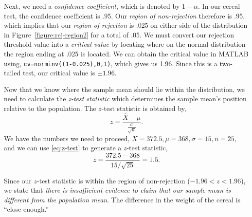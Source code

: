 Next, we need a \emph{confidence coefficient}, which is denoted by $1-\alpha$. In our cereal test, the confidence coefficient is .95. Our \emph{region of non-rejection} therefore is .95, which implies that our \emph{region of rejection} is .025 on either side of the distribution in Figure~\ref{figure:rej-region2} for a total of .05. We must convert our rejection threshold value into a \emph{critical value} by locating where on the normal distribution the region ending at .025 is located. We can obtain the critical value in MATLAB using,
\texttt{cv=norminv((1-0.025),0,1)}, which gives  us 1.96. Since this is a two-tailed test, our critical value is $\pm 1.96$.

Now that we know where the sample mean should lie within the distribution, we need to calculate the \emph{z-test statistic} which determines the sample mean's position relative to the population. The $z$-test statistic is obtained by,
\begin{equation}
\boxed{\quad z = \frac{\bar{X} - \mu}{\frac{\sigma}{\sqrt{n}}}. \quad}
\label{eq:z-test}
\end{equation}
We have the numbers we need to proceed, $\bar{X}=372.5, \mu=368, \sigma=15, n=25$, and we can use \eqref{eq:z-test} to generate a $z$-test statistic,
\[
z = \frac{372.5 - 368}{15/\sqrt{25}} = 1.5.
\]

Since our $z$-test statistic is within the region of non-rejection ($-1.96 < z < 1.96$), we state that \emph{there is insufficient evidence to claim that our sample mean is different from the population mean}. The difference in the weight of the cereal is ``close enough.''


